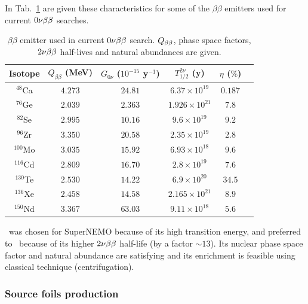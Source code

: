In Tab.~\ref{tab:bb_isotopes} are given these characteristics for some of the $\beta\beta$ emitters used for current $0\nu\beta\beta$ searches.
\begin{table}[h!]
\centering
\begin{tabular}{|c|c|c|c|c|c|}
\hline
Isotope & $Q_{\beta\beta}$ (MeV) & $G_{0\nu}$ ($10^{-15}$ y$^{-1}$) & $T^{2\nu}_{1/2}$ (y) & $\eta$ ($\%$) \\
\hline
\hline
$^{48}$Ca & $4.273$ & $24.81$ & $6.37\times 10^{19}$ & $0.187$ \\
$^{76}$Ge & $2.039$ & $2.363$ & $1.926\times 10^{21}$ & $7.8$ \\
$^{82}$Se & $2.995$ & $10.16$ & $9.6\times 10^{19}$ & $9.2$ \\
$^{96}$Zr & $3.350$ & $20.58$ & $2.35\times 10^{19}$ & $2.8$ \\
$^{100}$Mo & $3.035$ & $15.92$ & $6.93\times 10^{18}$ & $9.6$ \\
$^{116}$Cd & $2.809$ & $16.70$ & $2.8\times 10^{19}$ & $7.6$ \\
$^{130}$Te & $2.530$ & $14.22$ & $6.9\times 10^{20}$ & $34.5$ \\
$^{136}$Xe & $2.458$ & $14.58$ & $2.165\times 10^{21}$ & $8.9$ \\
$^{150}$Nd & $3.367$ & $63.03$ & $9.11\times 10^{18}$ & $5.6$ \\
\hline
\end{tabular}
\caption{$\beta\beta$ emitter used in current $0\nu\beta\beta$ search.
$Q_{\beta\beta}$, phase space factors, $2\nu\beta\beta$ half-lives and natural abundances are given.
\label{tab:bb_isotopes}}
\end{table}
\Se\ was chosen for SuperNEMO because of its high transition energy, and preferred to \Mo\ because of its higher $2\nu\beta\beta$ half-life (by a factor $\sim13$).
Its nuclear phase space factor and natural abundance are satisfying and its enrichment is feasible using classical technique (centrifugation).

\subsubsection*{Source foils production}

